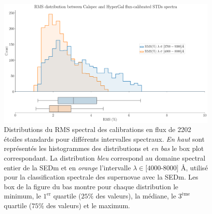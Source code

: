 \documentclass[../main/main.tex]{subfiles}
\begin{document}
\begin{figure}[ht]
  \centering
  \includegraphics[width=0.99\textwidth]{../figures/06_irf/rmsallstd_fluxcalibration.pdf}
  \caption[Distributions du RMS spectral des
  calibrations en flux pour différents intervalles spectraux]{Distributions du RMS spectral des
  calibrations en flux de 2202 étoiles standards pour différents
  intervalles spectraux. \emph{En haut} sont représentés les
  histogrammes des distributions et \emph{en bas} le box plot
  correspondant. La distribution \emph{bleu} correspond au domaine
  spectral entier de la SEDm et en \emph{orange} l'intervalle
  $\lambda\in$[$4000$-$8000$] \AA, utilisé pour la classification
  spectrale des supernovae avec la SEDm. Les box de la figure du bas montre
  pour chaque distribution le minimum, le $1^{\text{er}}$ quartile ($25\%$ des
  valeurs), la médiane, le $3^{\text{ème}}$ quartile ($75\%$ des
  valeurs) et le maximum.}
  \label{fig:rms_allstd}
\end{figure}
\end{document}
